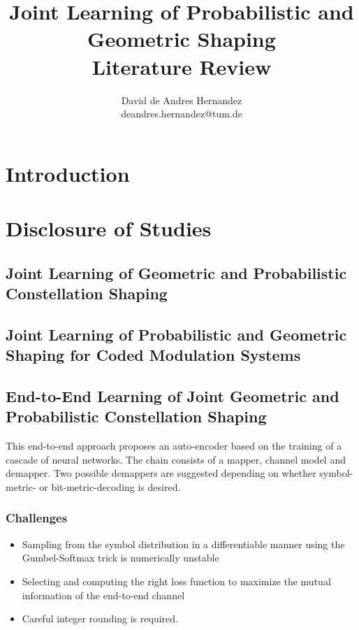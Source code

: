 \documentclass[11pt]{article}
\title{Joint Learning of Probabilistic and Geometric Shaping \\ Literature Review}
\author{David de Andres Hernandez \\ deandres.hernandez@tum.de}
\begin{document}
\maketitle
\section{Introduction}
\section{Disclosure of Studies}
\subsection{Joint Learning of Geometric and Probabilistic Constellation Shaping ~\cite{9024567}}
\subsection{Joint Learning of Probabilistic and Geometric Shaping for Coded Modulation Systems ~\cite{9348032}}
\subsection{End-to-End Learning of Joint Geometric and Probabilistic Constellation Shaping ~\cite{https://doi.org/10.48550/arxiv.2112.05050}}
This end-to-end approach proposes an auto-encoder based on the training of a cascade of neural networks. The chain consists of a mapper, channel model and demapper. Two possible demappers are suggested depending on whether symbol-metric- or bit-metric-decoding is desired.
\subsubsection{Challenges}
\begin{itemize}
\item Sampling from the symbol distribution in a differentiable manner using the Gumbel-Softmax trick is numerically unstable
\item Selecting and computing the right loss function to maximize the mutual information of the end-to-end channel
\item Careful integer rounding is required.
\end{itemize}
\end{document}
